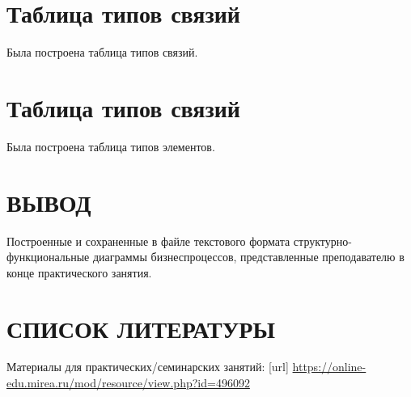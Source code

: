 


\newpage

\section{Таблица типов связий}

Была построена таблица типов связий.



\newpage

\section{Таблица типов связий}

Была построена таблица типов элементов.




\newpage

\section*{ВЫВОД}
Построенные и сохраненные в
файле текстового формата структурно-функциональные диаграммы бизнеспроцессов,
представленные преподавателю в конце практического занятия.

\section*{СПИСОК ЛИТЕРАТУРЫ}
\begin{thebibliography}{}
	\bibitem{}  Материалы для практических/семинарских занятий: [url]
	\url{https://online-edu.mirea.ru/mod/resource/view.php?id=496092}
\end{thebibliography}
